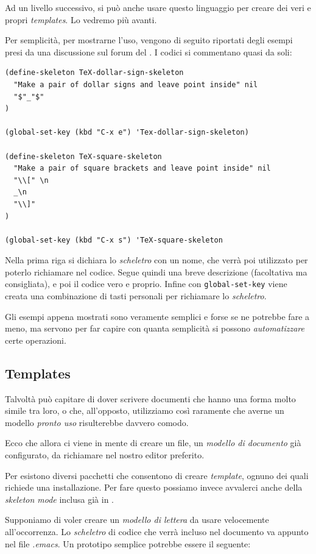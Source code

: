 \documentclass[10pt,a4paper]{article}
\begin{document}
Ad un livello successivo, si può anche usare questo linguaggio per
creare dei veri e propri \emph{templates}. Lo vedremo più avanti.

Per semplicità, per mostrarne l'uso, vengono di seguito riportati
degli esempi presi da una discussione sul forum del \guit. I codici si
commentano quasi da soli:
\begin{Verbatim}
(define-skeleton TeX-dollar-sign-skeleton
  "Make a pair of dollar signs and leave point inside" nil
  "$"_"$"
)

(global-set-key (kbd "C-x e") 'Tex-dollar-sign-skeleton) 

(define-skeleton TeX-square-skeleton
  "Make a pair of square brackets and leave point inside" nil
  "\\[" \n
  _\n
  "\\]"
)

(global-set-key (kbd "C-x s") 'TeX-square-skeleton
\end{Verbatim}
Nella prima riga si dichiara lo \emph{scheletro} con un nome, che
verrà poi utilizzato per poterlo richiamare nel codice. Segue quindi
una breve descrizione (facoltativa ma consigliata), e poi il codice
vero e proprio. Infine con \verb!global-set-key! viene creata una
combinazione di tasti personali per richiamare lo \emph{scheletro}.

Gli esempi appena mostrati sono veramente semplici e forse se ne
potrebbe fare a meno, ma servono per far capire con quanta semplicità si
possono \emph{automatizzare} certe operazioni.

\subsection*{Templates}
\label{sec:skeltempl}

Talvoltà può capitare di dover scrivere documenti che hanno una forma
molto simile tra loro, o che, all'opposto, utilizziamo così raramente
che averne un modello \emph{pronto uso} risulterebbe davvero comodo.

Ecco che allora ci viene in mente di creare un file, un \emph{modello
  di documento} già configurato, da richiamare nel nostro editor
preferito.

Per \emacs{} esistono diversi pacchetti che consentono di creare
\emph{template}, ognuno dei quali richiede una installazione. Per fare
questo possiamo invece avvalerci anche della \emph{skeleton mode}
inclusa già in \emacs{}.

Supponiamo di voler creare un \emph{modello di lettera} da usare
velocemente all'occorrenza. Lo \emph{scheletro} di codice che verrà
incluso nel documento va appunto nel file \emph{.emacs}. Un prototipo
semplice potrebbe essere il seguente:
\end{document}
